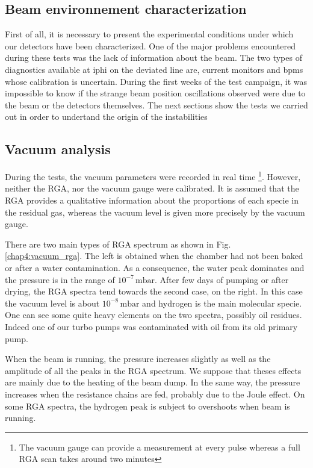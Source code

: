 \begin{refsection}
  

  \section{Beam environnement characterization}
  First of all, it is necessary to present the experimental conditions under which our detectors have been characterized. One of the major problems encountered during these tests was the lack of information about the beam. The two types of diagnostics available at \acrshort{iphi} on the deviated line are, current monitors and \acrshort{bpm}s whose calibration is uncertain. During the first weeks of the test campaign, it was impossible to know if the strange beam position oscillations observed were due to the beam or the detectors themselves. The next sections show the tests we carried out in order to undertand the origin of the instabilities

  \subsection{Vacuum analysis}
  \label{sec4:vacuum}
  During the tests, the vacuum parameters were recorded in real time \footnote{The vacuum gauge can provide a measurement at every pulse whereas a full RGA scan takes around two minutes}. However, neither the RGA, nor the vacuum gauge were calibrated. It is assumed that the RGA provides a qualitative information about the proportions of each specie in the residual gas, whereas the vacuum level is given more precisely by the vacuum gauge.

  There are two main types of RGA spectrum as shown in Fig. \ref{chap4:vacuum_rga}. The left is obtained when the chamber had not been baked or after a water contamination. As a consequence, the water peak dominates and the pressure is in the range of $10^{-7}\,\mathrm{mbar}$. After few days of pumping or after drying, the RGA spectra tend towards the second case, on the right. In this case the vacuum level is about $10^{-8}\,\mathrm{mbar}$ and hydrogen is the main molecular specie. One can see some quite heavy elements on the two spectra, possibly oil residues. Indeed one of our turbo pumps was contaminated with oil from its old primary pump.

  

  When the beam is running, the pressure increases slightly as well as the amplitude of all the peaks in the RGA spectrum. We suppose that theses effects are mainly due to the heating of the beam dump. In the same way, the pressure increases when the resistance chains are fed, probably due to the Joule effect. On some RGA spectra, the hydrogen peak is subject to overshoots when beam is running.


\end{refsection}
